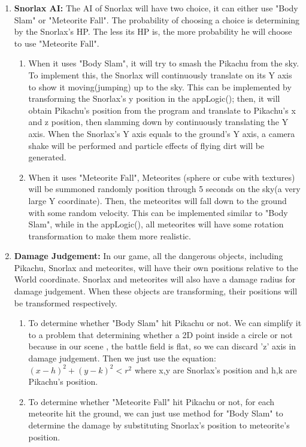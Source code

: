 \documentclass {article}
\begin{document}
    \begin{enumerate}
    \item \textbf{Snorlax AI:} The AI of Snorlax will have two choice, it can either use "Body Slam" or "Meteorite Fall". The probability of choosing a choice is determining by the Snorlax's HP.
    The less its HP is, the more probability he will choose to use "Meteorite Fall".
    \begin{enumerate}
        \item When it uses "Body Slam",
        it will try to smash the Pikachu from the sky. To implement this, the Snorlax will continuously translate on its Y axis to show it moving(jumping) up to the sky. This can be implemented by 
        transforming the Snorlax's y position in the appLogic(); then, it will obtain Pikachu's position from the program and translate to Pikachu's x and z position, then slamming down by continuously translating the Y axis. When the Snorlax's Y axis equals to 
        the ground's Y axis, a camera shake will be performed and particle effects of flying dirt will be generated.
        \item When it uses "Meteorite Fall", Meteorites (sphere or cube with textures) will be summoned randomly position through 5 seconds on the sky(a very large Y coordinate). Then, the meteorites will fall down
        to the ground with some random velocity. This can be implemented similar to "Body Slam", while in the appLogic(), all meteorites will have some rotation transformation to make them more realistic. 
    \end{enumerate}
    \item \textbf{Damage Judgement:}
    In our game, all the dangerous objects, including Pikachu, Snorlax and meteorites, will have their own positions relative to the World coordinate. Snorlax and meteorites will also have 
    a damage radius for damage judgement. When these objects are transforming, their positions will be transformed respectively.
    \begin{enumerate}
        \item To determine whether "Body Slam" hit Pikachu or not. We can simplify it to a problem that determining whether a 2D point inside a circle or not because in our scene
        , the battle field is flat, so we can discard 'z' axis in damage judgement. Then we just use the equation: $(x-h)^2 + (y-k)^2 < r^2$ where x,y are Snorlax's position and h,k are Pikachu's position.
        \item To determine whether "Meteorite Fall" hit Pikachu or not, for each meteorite hit the ground, we can just use method for "Body Slam" to determine the damage by substituting Snorlax's position to meteorite's position.

\end{enumerate}
\end{enumerate}
\end{document}
